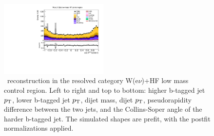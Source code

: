 \begin{figure}[tbp]
\begin{center}
    \includegraphics[width=0.48\textwidth]{figures/wlnhbb2016/resolved/WenWHHeavyFlavorCRLowMass_hbbCosThetaCSJ1.pdf}
    \caption{\HBB\ reconstruction in the resolved category W(e$\nu$)+HF low mass control region.
    Left to right and top to bottom: higher b-tagged jet $p_{\mathrm{T}}$, lower b-tagged jet $p_{\mathrm{T}}$, dijet mass, dijet $p_{\mathrm{T}}$, 
    pseudorapidity difference between the two jets, and the Collins-Soper angle of the harder b-tagged jet.
    The simulated shapes are prefit, with the postfit normalizations applied.}
    \label{fig:res_WenHFLowMass_Hbb}
  \end{center}
\end{figure}
\clearpage

